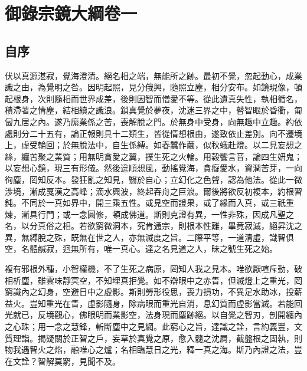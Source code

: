 
\newpage
\chapter{御錄宗鏡大綱卷一}

\section{自序}
伏以真源湛寂，覺海澄清。絕名相之端，無能所之跡。最初不覺，忽起動心，成業識之由，為覺明之咎。因明起照，見分俄興，隨照立塵，相分安布。如鏡現像，頓起根身，次則隨相而世界成差，後則因智而憎愛不等。從此遺真失性，執相循名，積滯著之情塵，結相續之識浪。鎖真覺於夢夜，沈迷三界之中，瞽智眼於昏衢，匍匐九居之內。遂乃縻業係之苦，喪解脫之門。於無身中受身，向無趣中立趣。約依處則分二十五有，論正報則具十二類生，皆從情想根由，遂致依止差別。向不遷境上，虛受輪回；於無脫法中，自生係縛。如春蠶作繭，似秋蛾赴燈。以二見妄想之絲，纏苦聚之業質；用無明貪愛之翼，撲生死之火輪。用穀饗言音，論四生妍鬼；以妄想心鏡，現三有形儀。然後違順想風，動搖覺海，貪癡愛水，資潤苦芽，一向徇塵，罔知反本。發狂亂之知見，翳於自心；立幻化之色聲，認為他法。從此一微涉境，漸成戛漢之高峰；滴水興波，終起吞舟之巨浪。爾後將欲反初複本，約根習鈍。不同於一真如界中，開三乘五性。或見空而證果，或了緣而入真，或三祇重煉，漸具行門；或一念圓修，頓成佛道。斯則克證有異，一性非殊，因成凡聖之名，以分真俗之相。若欲窮微洞本，究肯通宗，則根本性離，畢竟寂滅，絕昇沈之異，無縛脫之殊，既無在世之人，亦無滅度之旨。二際平等，一道清虛，識智俱空，名體鹹寂，迥無所有，唯一真心。達之名見道之人，昧之號生死之始。

複有邪根外種，小智權機，不了生死之病原，罔知人我之見本。唯欲厭喧斥動，破相析塵，雖雲味靜冥空，不知埋真拒覺。如不辯眼中之赤眚，但滅燈上之重光，罔窮識內之幻身，空避日中之虛影。斯則勞形役思，喪力損功，不異足水助冰，投薪益火。豈知重光在眚，虛影隨身，除病眼而重光自消，息幻質而虛影當滅。若能回光就已，反境觀心，佛眼明而業影空，法身現而塵跡絕。以自覺之智刃，剖開纏內之心珠；用一念之慧鋒，斬斷塵中之見網。此窮心之旨，達識之詮，言約義豐，文質理詣。揭疑關於正智之戶，妄草於真覺之原，愈入髓之沈屙，截盤根之固執，則物我遇智火之焰，融唯心之爐；名相臨慧日之光，釋一真之海。斯乃內證之法，豈在文詮？智解莫窮，見聞不及。

